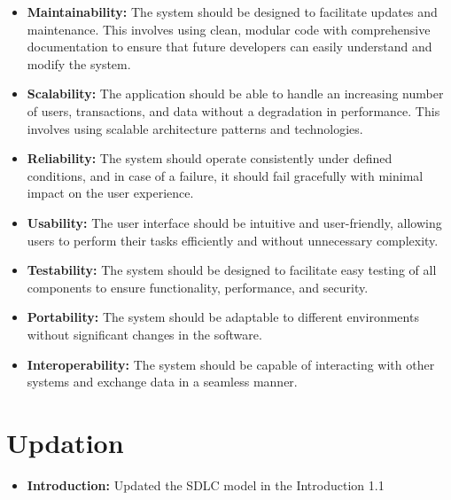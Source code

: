 \documentclass{article}
\begin{document}
\vspace{1em}

\begin{itemize}
    \item \textbf{Maintainability:} The system should be designed to facilitate updates and maintenance. This involves using clean, modular code with comprehensive documentation to ensure that future developers can easily understand and modify the system.

    \item \textbf{Scalability:} The application should be able to handle an increasing number of users, transactions, and data without a degradation in performance. This involves using scalable architecture patterns and technologies.

    \item \textbf{Reliability:} The system should operate consistently under defined conditions, and in case of a failure, it should fail gracefully with minimal impact on the user experience.

    \item \textbf{Usability:} The user interface should be intuitive and user-friendly, allowing users to perform their tasks efficiently and without unnecessary complexity.

    \item \textbf{Testability:} The system should be designed to facilitate easy testing of all components to ensure functionality, performance, and security.

    \item \textbf{Portability:} The system should be adaptable to different environments without significant changes in the software.

    \item \textbf{Interoperability:} The system should be capable of interacting with other systems and exchange data in a seamless manner.
\end{itemize}

\newpage
\section{Updation}
\begin{itemize}
   \item \textbf{Introduction:} Updated the SDLC model in the Introduction 1.1
\end{itemize}
\end{document}
